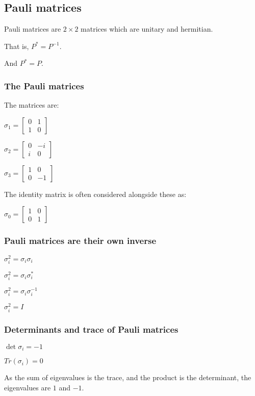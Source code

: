 
\subsection{Pauli matrices}

Pauli matrices are \(2\times 2\) matrices which are unitary and hermitian.

That is, \(P^*=P^{-1}\).

And \(P^*=P\).

\subsubsection{The Pauli matrices}

The matrices are:

\(\sigma_1 =\begin{bmatrix} 0&1  \\ 1&0  \end{bmatrix}\)

\(\sigma_2 =\begin{bmatrix} 0&-i \\ i&0  \end{bmatrix}\)

\(\sigma_3 =\begin{bmatrix} 1&0  \\ 0&-1 \end{bmatrix}\)

The identity matrix is often considered alongside these as:

\(\sigma_0 =\begin{bmatrix} 1&0  \\ 0&1  \end{bmatrix}\)

\subsubsection{Pauli matrices are their own inverse}

\(\sigma_i^2 =\sigma_i\sigma_i\)

\(\sigma_i^2 =\sigma_i\sigma_i^*\)

\(\sigma_i^2 =\sigma_i\sigma_i^{-1}\)

\(\sigma_i^2 =I\)

\subsubsection{Determinants and trace of Pauli matrices}

\(\det \sigma_i =-1\)

\(Tr (\sigma_i) =0\)

As the sum of eigenvalues is the trace, and the product is the determinant, the eigenvalues are \(1\) and \(-1\).

